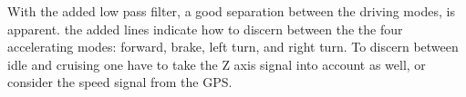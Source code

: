 With the added low pass filter, a good separation between the driving modes, is apparent. the added lines indicate how to discern between the the four accelerating modes: forward, brake, left turn, and right turn. To discern between idle and cruising one have to take the Z axis signal into account as well, or consider the speed signal from the GPS.  

